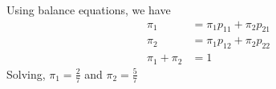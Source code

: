 \documentclass[../../probability-notes.tex]{subfiles}
\begin{document}
        Using balance equations, we have
        \begin{align*}
            \pi_{1} &= \pi_{1}p_{11} + \pi_{2}p_{21}\\
            \pi_{2} &= \pi_{1}p_{12} + \pi_{2}p_{22}\\
            \pi_{1} + \pi_{2} &= 1
        \end{align*}
        Solving, $\pi_{1} = \frac{2}{7}$ and $\pi_{2} = \frac{5}{7}$
\end{document}
